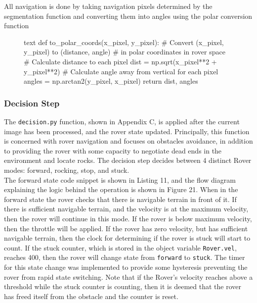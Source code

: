 \documentclass[a4paper]{article}
\begin{document}
All navigation is done by taking navigation pixels determined by the segmentation function and converting them into angles using the polar conversion function

\begin{figure}[h]\scriptsize
\begin{sexylisting}{text}
def to_polar_coords(x_pixel, y_pixel):
    # Convert (x_pixel, y_pixel) to (distance, angle) 
    # in polar coordinates in rover space
    # Calculate distance to each pixel
    dist = np.sqrt(x_pixel**2 + y_pixel**2)
    # Calculate angle away from vertical for each pixel
    angles = np.arctan2(y_pixel, x_pixel)
    return dist, angles
\end{sexylisting}
\end{figure}

\subsubsection{Decision Step}
The \verb|decision.py| function, shown in Appendix C, is applied after the current image has been processed, and the rover state updated. Principally, this function is concerned with rover navigation and focuses on obstacles avoidance, in addition to providing the rover with some capacity to negotiate dead ends in the environment and locate rocks. The decision step decides between 4 distinct Rover modes: forward, rocking, stop, and stuck.\\

The forward state code snippet is shown in Listing 11, and the flow diagram explaining the logic behind the operation is shown in Figure 21. When in the forward state the rover checks that there is navigable terrain in front of it. If there is sufficient navigable terrain, and the velocity is at the maximum velocity, then the rover will continue in this mode. If the rover is below maximum velocity, then the throttle will be applied. If the rover has zero velocity, but has sufficient navigable terrain, then the clock for determining if the rover is stuck will start to count. If the stuck counter, which is stored in the object variable \verb|Rover.vel|, reaches 400, then the rover will change state from \verb|forward| to \verb|stuck|. The timer for this state change was implemented to provide some hysteresis preventing the rover from rapid state switching. Note that if the Rover's velocity reaches above a threshold while the stuck counter is counting, then it is deemed that the rover has freed itself from the obstacle and the counter is reset.\\
\end{document}
